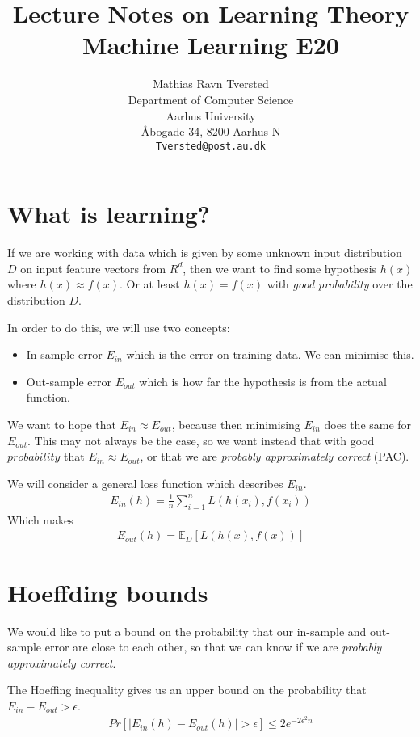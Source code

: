 \documentclass{article}
\title{Lecture Notes on Learning Theory\\Machine Learning E20}
\author{
 Mathias Ravn Tversted \\
  Department of Computer Science\\
  Aarhus University\\
  Åbogade 34, 8200 Aarhus N \\
  \texttt{Tversted@post.au.dk} \\
}
\begin{document}
\maketitle
\tableofcontents
\newpage


\section{What is learning?}
  If we are working with data which is given by some unknown input distribution $D$ on input feature vectors from $R^d$, then we want to find some hypothesis $h(x)$ where $h(x) \approx f(x)$. 
  Or at least $h(x) = f(x)$ with \emph{good probability} over the distribution $D$.

  In order to do this, we will use two concepts:
  \begin{itemize}
    \item In-sample error $E_{in}$ which is the error on training data. We can minimise this.
    \item Out-sample error $E_{out}$ which is how far the hypothesis is from the actual function.
  \end{itemize}
  We want to hope that $E_{in} \approx E_{out}$, because then minimising $E_{in}$ does the same for $E_{out}$.
  This may not always be the case, so we want instead that with good $probability$ that $E_{in} \approx E_{out}$, or that we are \emph{probably approximately correct} (PAC).
  
  We will consider a general loss function which describes $E_{in}$. 
  \begin{align}
    E_{in}(h) = \frac{1}{n}\sum_{i=1}^{n}{L(h(x_i), f(x_i))}
  \end{align}
  Which makes 
  \begin{align}
    E_{out}(h) = \mathbb{E}_D[L(h(x), f(x))]
  \end{align}
  
\section{Hoeffding bounds}
  We would like to put a bound on the probability that our in-sample and out-sample error are close to each other, so that we can know if we are \emph{probably approximately correct}. 

  The Hoeffing inequality gives us an upper bound on the probability that $E_{in} - E_{out} > \epsilon$. 
  \begin{align}
    Pr[|E_{in}(h)-E_{out}(h)|\gt \epsilon] \leq 2e^{-2\epsilon^2n}
  \end{align}
\end{document}
